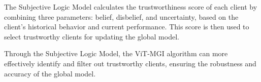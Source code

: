 \documentclass[conference]{IEEEtran}
\begin{document}
The Subjective Logic Model\cite{Subjective_Logic_Model} calculates the trustworthiness score of each client by combining three parameters: belief, disbelief, and uncertainty, based on the client's historical behavior and current performance. This score is then used to select trustworthy clients for updating the global model.


Through the Subjective Logic Model, the ViT-MGI algorithm can more effectively identify and filter out trustworthy clients, ensuring the robustness and accuracy of the global model.

                
                
                
                
\end{document}
